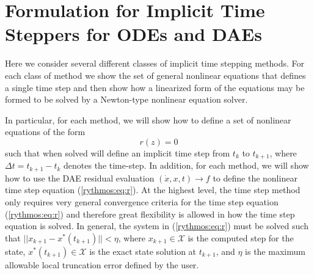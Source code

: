 
\section{Formulation for Implicit Time Steppers for ODEs and DAEs}

\label{rythmos:sec:implicit-time-steppers}

Here we consider several different classes of implicit time stepping
methods. For each class of method we show the set of general nonlinear
equations that defines a single time step and then show how a linearized
form of the equations may be formed to be solved by a Newton-type
nonlinear equation solver.

In particular, for each method, we will show how to define a set of
nonlinear equations of the form 
\begin{equation}
r(z)=0\label{rythmos:eq:r}
\end{equation}
such that when solved will define an implicit time step from $t_{k}$
to $t_{k+1}$, where $\Delta t=t_{k+1}-t_{k}$ denotes the time-step.
In addition, for each method, we will show how to use the DAE residual
evaluation $(\dot{x},x,t){}\rightarrow f$ to define the nonlinear
time step equation (\ref{rythmos:eq:r}). At the highest level, the
time step method only requires very general convergence criteria for
the time step equation (\ref{rythmos:eq:r}) and therefore great flexibility
is allowed in how the time step equation is solved. In general, the
system in (\ref{rythmos:eq:r}) must be solved such that $||x_{k+1}-x^{*}(t_{k+1})||<\eta$,
where $x_{k+1}\in\mathcal{X}$ is the computed step for the state,
$x^{*}(t_{k+1})\in\mathcal{X}$ is the exact state solution at $t_{k+1}$,
and $\eta$ is the maximum allowable local truncation error defined
by the user.

